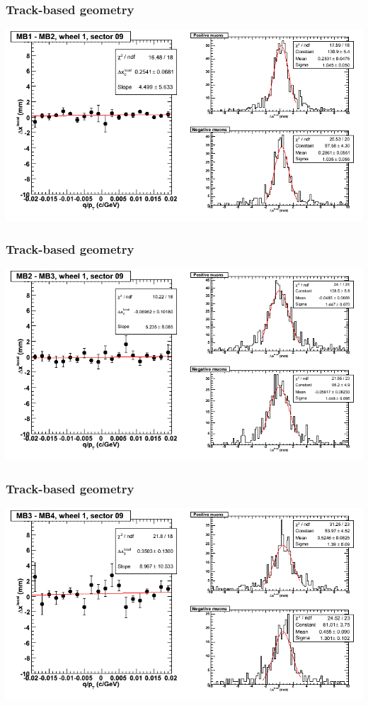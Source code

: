 \documentclass[compress]{beamer}
\begin{document}
\begin{frame}
\frametitle{Track-based geometry}
\includegraphics[width=\linewidth]{NOV4_segdiffs/dt13_resid_D_09_12.png}
\end{frame}

\begin{frame}
\frametitle{Track-based geometry}
\includegraphics[width=\linewidth]{NOV4_segdiffs/dt13_resid_D_09_23.png}
\end{frame}

\begin{frame}
\frametitle{Track-based geometry}
\includegraphics[width=\linewidth]{NOV4_segdiffs/dt13_resid_D_09_34.png}
\end{frame}
\end{document}
